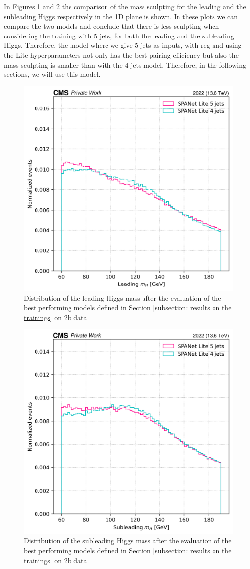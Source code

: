 In Figures \ref{fig: 1D mass sculpting leading} and \ref{fig: 1D mass sculpting subleading} the comparison of the mass sculpting for the leading and the subleading Higgs respectively in the 1D plane is shown. In these plots we can compare the two models and conclude that there is less sculpting when considering the training with 5 jets, for both the leading and the subleading Higgs. Therefore, the model where we give 5 jets as inputs, with \pt reg and using the Lite hyperparameters not only has the best pairing efficiency but also the mass sculpting is smaller than with the 4 jets model. Therefore, in the following sections, we will use this model.

\begin{figure}[hbt]
    \centering
    \includegraphics[width=0.6\linewidth]{Images/6.Improving/Mass sculpting/lead h sculpting.png}
    \caption{Distribution of the leading Higgs mass after the evaluation of the best performing models defined in Section \ref{subsection: results on the trainings} on 2b data}
    \label{fig: 1D mass sculpting leading}
\end{figure}

\begin{figure}[hbt]
    \centering
    \includegraphics[width=0.6\linewidth]{Images/6.Improving/Mass sculpting/subleading h sculpting.png}
    \caption{Distribution of the subleading Higgs mass after the evaluation of the best performing models defined in Section \ref{subsection: results on the trainings} on 2b data}
    \label{fig: 1D mass sculpting subleading}
\end{figure}

